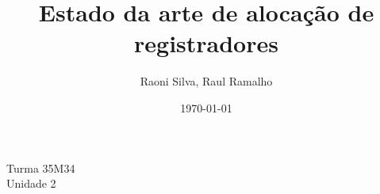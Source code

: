 \documentclass[a4paper,12pt]{article}
\title{Estado da arte de alocação de registradores}
\author{Raoni Silva, Raul Ramalho}
\date{\today}
\begin{document}
\maketitle

\noindent Turma 35M34 \\ Unidade 2

\newpage

\tableofcontents












\end{document}
